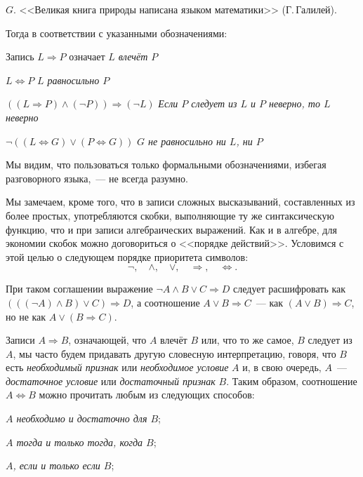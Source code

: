 $G$. <<Великая книга природы написана языком математики>> (Г.\,Галилей\footnotemark[4]).


Тогда в соответствии с указанными обозначениями:

Запись $L \Rightarrow P$ означает \emph{$L$ влечёт $P$}

$L \Leftrightarrow P$ \qquad \emph{$L$ равносильно $P$}

$((L \Rightarrow P) \land (\neg P)) \Rightarrow (\neg L)$ \qquad \emph{Если $P$ следует из $L$ и $P$ неверно, то $L$ неверно}

$\neg((L \Leftrightarrow G) \lor (P \Leftrightarrow G))$ \qquad \emph{$G$ не равносильно ни $L$, ни $P$}

Мы видим, что пользоваться только формальными обозначениями, избегая разговорного языка,~--- не всегда разумно.

Мы замечаем, кроме того, что в записи сложных высказываний, составленных из более простых, употребляются скобки, выполняющие ту же синтаксическую функцию, что и при записи алгебраических выражений. Как и в алгебре, для экономии скобок можно договориться о <<порядке действий>>. Условимся с этой целью о следующем порядке приоритета символов:
\[
\neg, \quad \land, \quad \lor, \quad \Rightarrow, \quad \Leftrightarrow.
\]

При таком соглашении выражение $\neg A \land B \lor C \Rightarrow D$ следует расшифровать как $(((\neg A) \land B) \lor C) \Rightarrow D$, а соотношение $A \lor B \Rightarrow C$~--- как $(A \lor B) \Rightarrow C$, но не как $A \lor (B \Rightarrow C)$.

Записи $A \Rightarrow B$, означающей, что $A$ влечёт $B$ или, что то же самое, $B$ следует из $A$, мы часто будем придавать другую словесную интерпретацию, говоря, что $B$ есть \emph{необходимый признак} или \emph{необходимое условие} $A$ и, в свою очередь, $A$~--- \emph{достаточное условие} или \emph{достаточный признак} $B$. Таким образом, соотношение $A \Leftrightarrow B$ можно прочитать любым из следующих способов:

\emph{$A$ необходимо и достаточно для $B$};

\emph{$A$ тогда и только тогда, когда $B$};

\emph{$A$, если и только если $B$};

